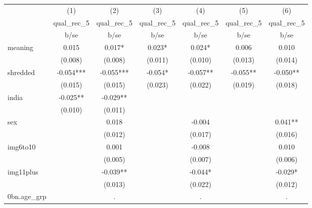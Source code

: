 {
\def\sym#1{\ifmmode^{#1}\else\(^{#1}\)\fi}
\begin{tabular}{l*{6}{c}}
\hline\hline
            &\multicolumn{1}{c}{(1)}&\multicolumn{1}{c}{(2)}&\multicolumn{1}{c}{(3)}&\multicolumn{1}{c}{(4)}&\multicolumn{1}{c}{(5)}&\multicolumn{1}{c}{(6)}\\
            &\multicolumn{1}{c}{qual\_rec\_5}&\multicolumn{1}{c}{qual\_rec\_5}&\multicolumn{1}{c}{qual\_rec\_5}&\multicolumn{1}{c}{qual\_rec\_5}&\multicolumn{1}{c}{qual\_rec\_5}&\multicolumn{1}{c}{qual\_rec\_5}\\
            &        b/se   &        b/se   &        b/se   &        b/se   &        b/se   &        b/se   \\
\hline
meaning     &       0.015   &       0.017*  &       0.023*  &       0.024*  &       0.006   &       0.010   \\
            &     (0.008)   &     (0.008)   &     (0.011)   &     (0.010)   &     (0.013)   &     (0.014)   \\
[1em]
shredded    &      -0.054***&      -0.055***&      -0.054*  &      -0.057** &      -0.055** &      -0.050** \\
            &     (0.015)   &     (0.015)   &     (0.023)   &     (0.022)   &     (0.019)   &     (0.018)   \\
[1em]
india       &      -0.025** &      -0.029** &               &               &               &               \\
            &     (0.010)   &     (0.011)   &               &               &               &               \\
[1em]
sex         &               &       0.018   &               &      -0.004   &               &       0.041** \\
            &               &     (0.012)   &               &     (0.017)   &               &     (0.016)   \\
[1em]
img6to10    &               &       0.001   &               &      -0.008   &               &       0.010   \\
            &               &     (0.005)   &               &     (0.007)   &               &     (0.006)   \\
[1em]
img11plus   &               &      -0.039** &               &      -0.044*  &               &      -0.029*  \\
            &               &     (0.013)   &               &     (0.022)   &               &     (0.012)   \\
[1em]
0bn.age\_grp &               &           .   &               &           .   &               &           .   \\

\end{tabular}}
